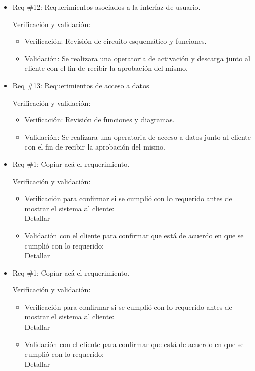 \documentclass[11pt]{charter}
\begin{document}
\begin{itemize}
\item Req \#12: Requerimientos asociados a la interfaz de usuario.

Verificación y validación:

\begin{itemize}
\item Verificación: Revisión de circuito esquemático y funciones.
\item Validación: Se realizara una operatoria de activación y descarga junto al cliente con el fin de recibir la aprobación del mismo.
\end{itemize}

\item Req \#13: Requerimientos de acceso a datos

Verificación y validación:

\begin{itemize}
\item Verificación: Revisión de funciones y diagramas.
\item Validación: Se realizara una operatoria de acceso a datos junto al cliente con el fin de recibir la aprobación del mismo. 
\end{itemize}

\item Req \#1: Copiar acá el requerimiento.

Verificación y validación:

\begin{itemize}
\item Verificación para confirmar si se cumplió con lo requerido antes de mostrar el sistema al cliente:\\
Detallar 
\item Validación con el cliente para confirmar que está de acuerdo en que se cumplió con lo requerido:\\
Detallar  
\end{itemize}

\item Req \#1: Copiar acá el requerimiento.

Verificación y validación:

\begin{itemize}
\item Verificación para confirmar si se cumplió con lo requerido antes de mostrar el sistema al cliente:\\
Detallar 
\item Validación con el cliente para confirmar que está de acuerdo en que se cumplió con lo requerido:\\
Detallar  
\end{itemize}


\end{itemize}
\end{document}
